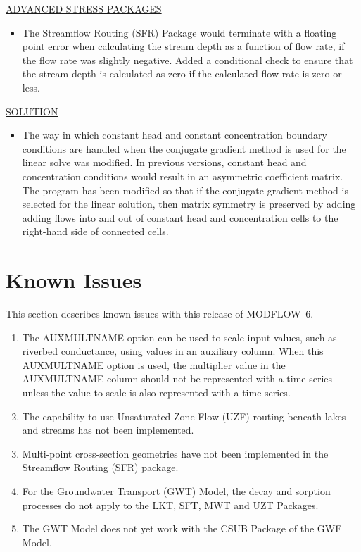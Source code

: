 \documentclass[11pt,twoside,twocolumn]{usgsreport}
\begin{document}
\begin{itemize}
	\underline{ADVANCED STRESS PACKAGES}
	\begin{itemize}
	        \item The Streamflow Routing (SFR) Package would terminate with a floating point error when calculating the stream depth as a function of flow rate, if the flow rate was slightly negative.  Added a conditional check to ensure that the stream depth is calculated as zero if the calculated flow rate is zero or less.
	\end{itemize}

	\underline{SOLUTION}
	\begin{itemize}
	        \item The way in which constant head and constant concentration boundary conditions are handled when the conjugate gradient method is used for the linear solve was modified.  In previous versions, constant head and concentration conditions would result in an asymmetric coefficient matrix.  The program has been modified so that if the conjugate gradient method is selected for the linear solution, then matrix symmetry is preserved by adding adding flows into and out of constant head and concentration cells to the right-hand side of connected cells.
	\end{itemize}

\end{itemize}


\section{Known Issues}
This section describes known issues with this release of MODFLOW~6.  

\begin{enumerate}

\item
The AUXMULTNAME option can be used to scale input values, such as riverbed conductance, using values in an auxiliary column.  When this AUXMULTNAME option is used, the multiplier value in the AUXMULTNAME column should not be represented with a time series unless the value to scale is also represented with a time series.  

\item
The capability to use Unsaturated Zone Flow (UZF) routing beneath lakes and streams has not been implemented.

\item
Multi-point cross-section geometries have not been implemented in the Streamflow Routing (SFR) package.

\item
For the Groundwater Transport (GWT) Model, the decay and sorption processes do not apply to the LKT, SFT, MWT and UZT Packages.

\item
The GWT Model does not yet work with the CSUB Package of the GWF Model.  

\end{enumerate}
\end{document}
